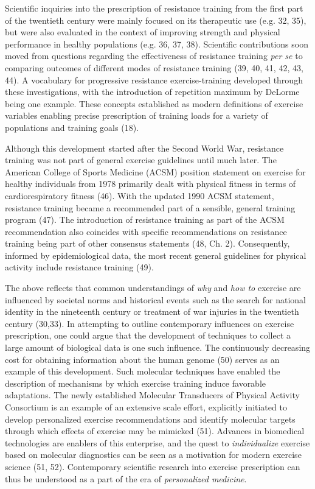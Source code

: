 \documentclass[twoside,10pt]{gihclass} %
\begin{document}
Scientific inquiries into the prescription of resistance training from the first part of the twentieth century were mainly focused on its therapeutic use
(e.g. 32, 35),
but were also evaluated in the context of improving strength and physical performance in healthy populations
(e.g. 36, 37, 38).
Scientific contributions soon moved from questions regarding the effectiveness of resistance training \emph{per se} to comparing outcomes of different modes of resistance training
(39, 40, 41, 42, 43, 44).
A vocabulary for progressive resistance exercise-training developed through these investigations, with
the introduction of repetition maximum by DeLorme being one example. These concepts established as modern definitions of exercise variables enabling precise prescription of training loads for a variety of populations and training goals
(18).

Although this development started after the Second World War, resistance training was not part of general exercise guidelines until much later.
The American College of Sports Medicine (ACSM) position statement on exercise for healthy individuals from 1978 primarily dealt with physical fitness in terms of cardiorespiratory fitness
(46).
With the updated 1990 ACSM statement, resistance training became a recommended part of a sensible, general training program
(47).
The introduction of resistance training as part of the ACSM recommendation also coincides with specific recommendations on resistance training being part of other consensus statements
(48, Ch. 2).
Consequently, informed by epidemiological data, the most recent general guidelines for physical activity include resistance training (49).

The above reflects that common understandings of \emph{why} and \emph{how to} exercise are influenced by societal norms and historical events such as the search for national identity in the nineteenth century or treatment of war injuries in the twentieth century
(30,33).
In attempting to outline contemporary influences on exercise prescription, one could argue that the development of techniques to collect a large amount of biological data is one such influence. The continuously decreasing cost for obtaining information about the human genome
(50) serves as an example of this development.
Such molecular techniques have enabled the description of mechanisms by which exercise training induce favorable adaptations. The newly established Molecular Transducers of Physical Activity Consortium is an example of an extensive scale effort, explicitly initiated to develop personalized exercise recommendations and identify molecular targets through which effects of exercise may be mimicked
(51).
Advances in biomedical technologies are enablers of this enterprise, and the quest to \emph{individualize} exercise based on molecular diagnostics can be seen as a motivation for modern exercise science
(51, 52).
Contemporary scientific research into exercise prescription can thus be understood as a part of the era of \emph{personalized medicine}.
\end{document}
